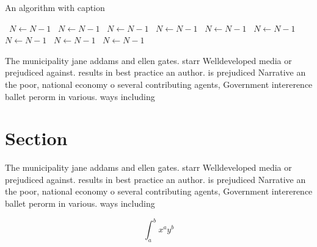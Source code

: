 \documentclass[a4paper]{article}
\begin{document}
\begin{algorithm}
\caption{An algorithm with caption}
\begin{algorithmic}
\    \State $N \gets N - 1$
\    \State $N \gets N - 1$
\    \State $N \gets N - 1$
\    \State $N \gets N - 1$
\    \State $N \gets N - 1$
\    \State $N \gets N - 1$
\    \State $N \gets N - 1$
\    \State $N \gets N - 1$
\    \State $N \gets N - 1$
\EndWhile
\end{algorithmic}
\end{algorithm}

The municipality jane addams and ellen gates. starr Welldeveloped media or prejudiced against. results in best practice an author. is prejudiced Narrative an the poor, national economy o several contributing agents, Government intererence ballet perorm in various. ways including

\section{Section}

The municipality jane addams and ellen gates. starr Welldeveloped media or prejudiced against. results in best practice an author. is prejudiced Narrative an the poor, national economy o several contributing agents, Government intererence ballet perorm in various. ways including

\[ \int_{a}^{b}{x^{a}y^{b}} \]
\end{document}
